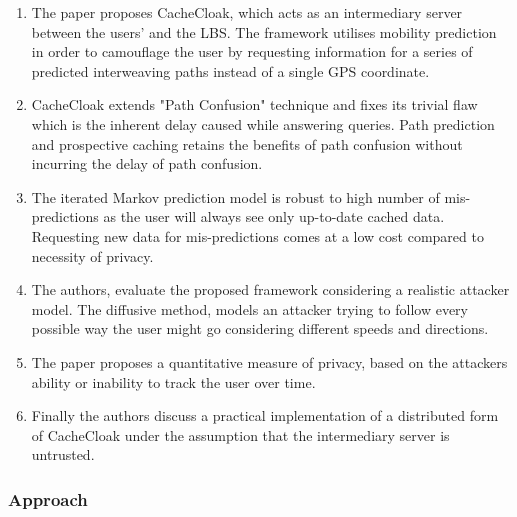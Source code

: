 \begin{enumerate}
	\item The paper proposes CacheCloak, which acts as an intermediary server 
	between the users' and the LBS. The framework utilises mobility prediction in
	order to camouflage the user by requesting information for a series of 
	predicted interweaving paths instead of a single GPS coordinate. 
	
	\item CacheCloak extends "Path Confusion" technique and fixes its trivial 
	flaw which is the inherent delay caused while answering queries. Path 
	prediction and prospective caching retains the benefits of path confusion 
	without incurring the delay of path confusion. 
	
	\item The iterated Markov prediction model is robust to high number of 
	mis-predictions as the user will always see only up-to-date cached data. 
	Requesting new data for mis-predictions comes at a low cost compared to 
	necessity of privacy. 
	
	\item The authors, evaluate the proposed framework considering a realistic
	attacker model. The diffusive method, models an attacker trying to follow
	every possible way the user might go considering different speeds and 
	directions. 
	
	\item The paper proposes a quantitative measure of privacy, based on 
	the attackers ability or inability to track the user over time. 
	
	\item Finally the authors discuss a practical implementation of a distributed
	form of CacheCloak under the assumption that the intermediary server is 
	untrusted. 
	
\end{enumerate}

\subsubsection*{Approach}

